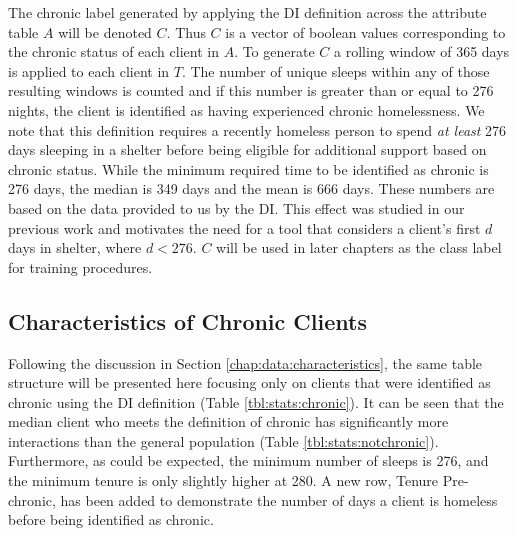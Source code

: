 The chronic label generated by applying the DI definition across the attribute table $A$ will be denoted $C$. Thus $C$ is a vector of boolean values corresponding to the chronic status of each client in $A$. To generate $C$ a rolling window of 365 days is applied to each client in $T$. The number of unique sleeps within any of those resulting windows is counted and if this number is greater than or equal to 276 nights, the client is identified as having experienced chronic homelessness. We note that this definition requires a recently homeless person to spend \emph{at least} 276 days sleeping in a shelter before being eligible for additional support based on chronic status.
While the minimum required time to be identified as chronic is 276 days, the median is 349 days and the mean is 666 days. These numbers are based on the data provided to us by the DI.
This effect was studied in our previous work \cite{messier2020} and motivates the need for a tool that considers a client's first $d$ days in shelter, where $d < 276$. $C$ will be used in later chapters as the class label for training procedures.

\subsection{Characteristics of Chronic Clients}

Following the discussion in Section \ref{chap:data:characteristics}, the same table structure will be presented here focusing only on clients that were identified as chronic using the DI definition (Table \ref{tbl:stats:chronic}). It can be seen that the median client who meets the definition of chronic has significantly more interactions than the general population (Table \ref{tbl:stats:notchronic}). Furthermore, as could be expected, the minimum number of sleeps is 276, and the minimum tenure is only slightly higher at 280. A new row, Tenure Pre-chronic, has been added to demonstrate the number of days a client is homeless before being identified as chronic. 


